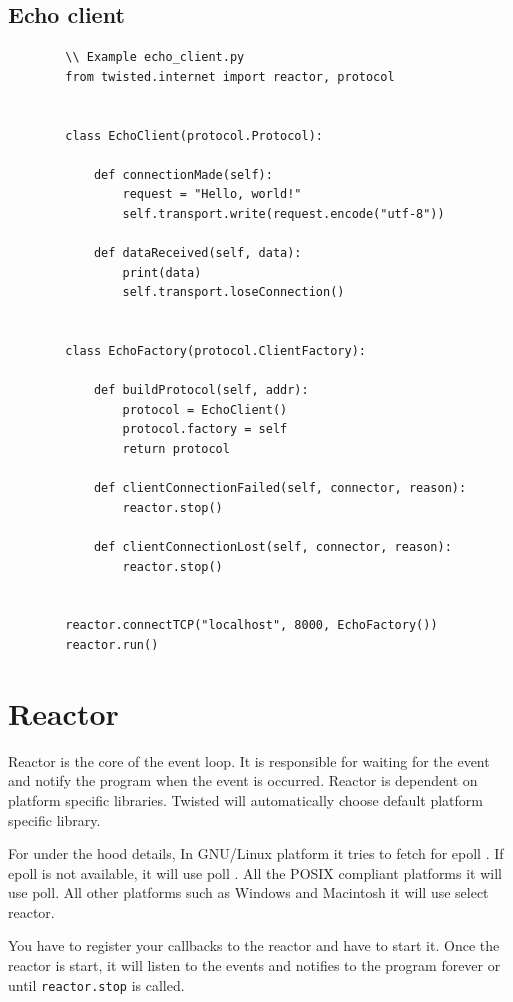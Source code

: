 \documentclass{article}
\begin{document}
      \subsection{Echo client}

      \begin{verbatim}
        \\ Example echo_client.py
        from twisted.internet import reactor, protocol


        class EchoClient(protocol.Protocol):

            def connectionMade(self):
                request = "Hello, world!"
                self.transport.write(request.encode("utf-8"))

            def dataReceived(self, data):
                print(data)
                self.transport.loseConnection()


        class EchoFactory(protocol.ClientFactory):

            def buildProtocol(self, addr):
                protocol = EchoClient()
                protocol.factory = self
                return protocol

            def clientConnectionFailed(self, connector, reason):
                reactor.stop()

            def clientConnectionLost(self, connector, reason):
                reactor.stop()


        reactor.connectTCP("localhost", 8000, EchoFactory())
        reactor.run()
      \end{verbatim}

  \section{Reactor}
    Reactor is the core of the event loop. It is responsible for waiting for
    the event and notify the program when the event is occurred. Reactor is
    dependent on platform specific libraries. Twisted will automatically choose
    default platform specific library.

    For under the hood details, In GNU/Linux platform it tries to fetch for
    epoll \cite{epoll}.  If epoll \cite{epoll} is not available, it will use
    poll \cite{poll}. All the POSIX compliant platforms it will use poll. All
    other platforms such as Windows and Macintosh it will use select reactor.

    You have to register your callbacks to the reactor and have to start it.
    Once the reactor is start, it will listen to the events and notifies to the
    program forever or until \texttt{reactor.stop} is called.
\end{document}
